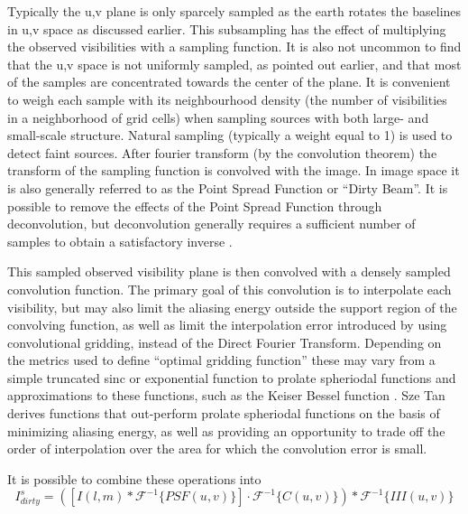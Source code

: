 \documentclass[a4paper,10pt]{report}
\begin{document}
 Typically the u,v plane is only sparcely sampled as the earth rotates the baselines in u,v space as discussed earlier. This subsampling has the effect of multiplying the observed visibilities with a sampling function. It is also
 not uncommon to find that the u,v space is not uniformly sampled, as pointed out earlier, and that most of the samples are concentrated towards the center of the plane. It is convenient to weigh each sample with its neighbourhood density 
 (the number of visibilities in a neighborhood of grid cells) when sampling sources with both large- and small-scale structure. Natural sampling (typically a weight equal to 1) is used to detect faint sources. After fourier transform
 (by the convolution theorem) the transform of the sampling function is convolved with the image. In image space it is also generally referred to as the Point Spread Function or ``Dirty Beam''. It is possible to remove
 the effects of the Point Spread Function through deconvolution, but deconvolution generally requires a sufficient number of samples to obtain a satisfactory inverse \cite{taylor1999synthesis}.
 
 This sampled observed visibility plane is then convolved with a densely sampled convolution function. The primary goal of this convolution is to interpolate each visibility, but may also limit the aliasing energy outside the support 
 region of the convolving function, as well as limit the interpolation error introduced by using convolutional gridding, instead of the Direct Fourier Transform. Depending on the metrics used to define ``optimal gridding function'' these may vary from a simple truncated sinc or exponential function 
 \cite[Lecture 7]{taylor1999synthesis} to prolate spheriodal functions and approximations to these functions, such as the Keiser Bessel function \cite{jackson1991selection}. Sze Tan \cite{tan1986aperture} derives functions that out-perform prolate spheriodal functions
 on the basis of minimizing aliasing energy, as well as providing an opportunity to trade off the order of interpolation over the area for which the convolution error is small.
 
 It is possible to combine these operations into 
 \begin{equation*}
  I^s_{dirty} = ([I(l,m)*\mathcal{F}^{-1}\{PSF(u,v)\}]\cdot\mathcal{F}^{-1}\{C(u,v)\}) * \mathcal{F}^{-1}\{III(u,v)\}
 \end{equation*}
\end{document}
